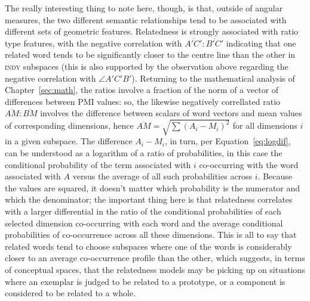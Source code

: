 The really interesting thing to note here, though, is that, outside of angular measures, the two different semantic relationships tend to be associated with different sets of geometric features.  Relatedness is strongly associated with ratio type features, with the negative correlation with $\overline{A'C'}:\overline{B'C'}$ indicating that one related word tends to be significantly closer to the centre line than the other in \textsc{indy} subspaces (this is also supported by the observation above regarding the negative correlation with $\angle A'C'B'$).  Returning to the mathematical analysis of Chapter~\ref{sec:math}, the ratios involve a fraction of the norm of a vector of differences between PMI values: so, the likewise negatively correllated ratio $\overline{AM}:\overline{BM}$ involves the difference between scalars of word vectors and mean values of corresponding dimensions, hence $\overline{AM} = \sqrt{\sum(A_{i}-M_{i})^2}$ for all dimensions $i$ in a given subspace.  The difference $A_{i}-M_{i}$, in turn, per Equation~\ref{eq:logdif}, can be understood as a logarithm of a ratio of probabilities, in this case the conditional probability of the term associated with $i$ co-occurring with the word associated with $A$ versus the average of all such probabilities across $i$.  Because the values are squared, it doesn't matter which probability is the numerator and which the denominator; the important thing here is that relatedness correlates with a larger differential in the ratio of the conditional probabilities of each selected dimension co-occurring with each word and the average conditional probabilities of co-occurrence across all these dimensions.  This is all to say that related words tend to choose subspaces where one of the words is considerably closer to an average co-occurrence profile than the other, which suggests, in terms of conceptual spaces, that the relatedness models may be picking up on situations where an exemplar is judged to be related to a prototype, or a component is considered to be related to a whole.

